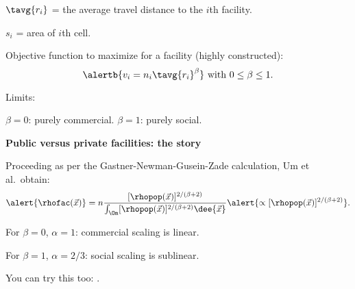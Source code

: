         $\tavg{r_i}$ = the average travel distance
        to the $i$th facility.
      
        $s_i$ = area of $i$th cell.
      
    
      Objective function to maximize for a facility (highly constructed):
      $$ 
      \alertb{v_i = n_i \tavg{r_i}^\beta}
      \
      \mbox{with}
      \
      0 \le \beta \le 1.
      $$
    
      Limits:
      
       $\beta = 0$: purely commercial.
       $\beta = 1$: purely social.
      
    
  


  \textbf{Public versus private facilities: the story}

  
   
    Proceeding as per the Gastner-Newman-Gusein-Zade calculation,
    Um et al.\ obtain:
    $$
    \alert{\rhofac(\vec{x})}
    =  n
    \frac{[\rhopop(\vec{x})]^{2/(\beta+2)}}
    {\int_{\Om} [\rhopop(\vec{x})]^{2/(\beta+2)} \dee{\vec{x}}}
    \alert{\propto [\rhopop(\vec{x})]^{2/(\beta+2)}}.
    $$
   
    For $\beta=0$, $\alpha=1$: commercial scaling is linear.
   
    For $\beta=1$, $\alpha=2/3$: social scaling is sublinear.
   
    You can try this too: \insertassignmentquestion{04}{4}{3}.
  



